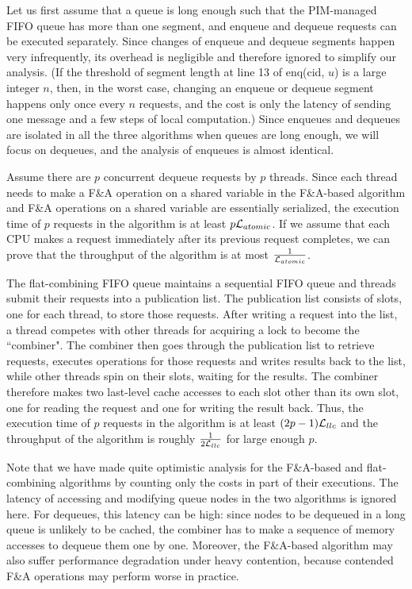 Let us first assume that a queue is long enough such that the PIM-managed FIFO queue 
has more than one segment, and enqueue and dequeue requests can be executed separately. 
Since changes of enqueue and dequeue segments happen very infrequently, 
its overhead is negligible and therefore ignored to simplify our analysis.
(If the threshold of segment length at line 13 of enq(cid, $u$) is a large integer $n$, 
then, in the worst case, changing an enqueue or dequeue segment happens only once every $n$ requests, 
and the cost is only the latency of sending one message and a few steps of local computation.)
Since enqueues and dequeues are isolated in all the three algorithms when queues are long enough, 
we will focus on dequeues, and the analysis of enqueues is almost identical. 

Assume there are $p$ concurrent dequeue requests by $p$ threads. 
Since each thread needs to make a F\&A operation on a shared variable in the F\&A-based algorithm 
and F\&A operations on a shared variable are essentially serialized, 
the execution time of $p$ requests in the algorithm is at least $p\mathcal{L}_{atomic}$. 
If we assume that each CPU makes a request immediately after its previous request completes, 
we can prove that the throughput of the algorithm is at most ${1 \over \mathcal{L}_{atomic}}$. 

The flat-combining FIFO queue maintains a sequential FIFO queue and 
threads submit their requests into a publication list. 
The publication list consists of slots, one for each thread, to store those requests.
After writing a request into the list, a thread competes with other threads for acquiring a lock 
to become the ``combiner". 
The combiner then goes through the publication list to retrieve requests, executes operations for 
those requests and writes results back to the list, while other threads spin on their slots, 
waiting for the results. 
The combiner therefore makes two last-level cache accesses to each slot other than its own slot, 
one for reading the request and one for writing the result back. 
Thus, the execution time of $p$ requests in the algorithm is at least $(2p-1)\mathcal{L}_{llc}$ and 
the throughput of the algorithm is roughly ${1 \over 2\mathcal{L}_{llc}}$ for large enough $p$.

Note that we have made quite optimistic analysis for the F\&A-based and flat-combining algorithms 
by counting only the costs in part of their executions. 
The latency of accessing and modifying queue nodes in the two algorithms is ignored here. 
For dequeues, this latency can be high: since nodes to be dequeued in a long queue is unlikely 
to be cached, the combiner has to make a sequence of memory accesses to dequeue them one by one.  
Moreover, the F\&A-based algorithm may also suffer performance degradation under heavy contention, 
because contended F\&A operations may perform worse in practice.


